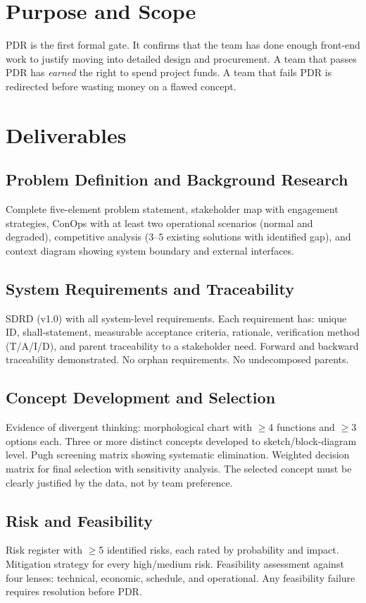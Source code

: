 \documentclass[11pt,letterpaper,twoside,openany]{book}
\begin{document}
\section{Purpose and Scope}
PDR is the first formal gate. It confirms that the team has done enough front-end work to justify moving into detailed design and procurement. A team that passes PDR has \emph{earned} the right to spend project funds. A team that fails PDR is redirected before wasting money on a flawed concept.

\section{Deliverables}

\subsection{Problem Definition and Background Research}
Complete five-element problem statement, stakeholder map with engagement strategies, ConOps with at least two operational scenarios (normal and degraded), competitive analysis (3--5 existing solutions with identified gap), and context diagram showing system boundary and external interfaces.

\subsection{System Requirements and Traceability}
SDRD (v1.0) with all system-level requirements. Each requirement has: unique ID, shall-statement, measurable acceptance criteria, rationale, verification method (T/A/I/D), and parent traceability to a stakeholder need. Forward and backward traceability demonstrated. No orphan requirements. No undecomposed parents.

\subsection{Concept Development and Selection}
Evidence of divergent thinking: morphological chart with $\geq$4 functions and $\geq$3 options each. Three or more distinct concepts developed to sketch/block-diagram level. Pugh screening matrix showing systematic elimination. Weighted decision matrix for final selection with sensitivity analysis. The selected concept must be clearly justified by the data, not by team preference.

\subsection{Risk and Feasibility}
Risk register with $\geq$5 identified risks, each rated by probability and impact. Mitigation strategy for every high/medium risk. Feasibility assessment against four lenses: technical, economic, schedule, and operational. Any feasibility failure requires resolution before PDR.
\end{document}
